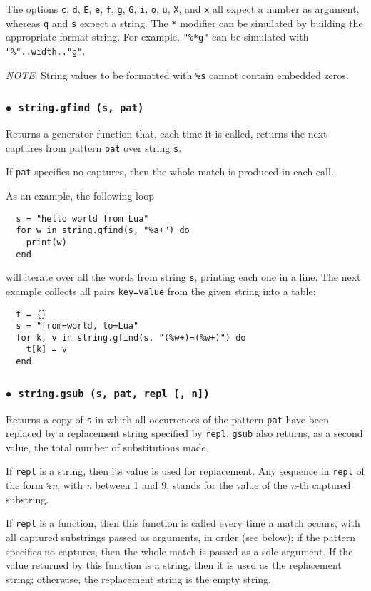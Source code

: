 \documentclass[11pt,twoside]{article}
\makeatletter
\newcommand{\M}[1]{{\rm\emph{#1}}}
\newcommand{\T}[1]{{\tt #1}}
\newcommand{\DefLIB}[1]{\index{#1@{\tt #1}}}
\newcommand{\ff}{$\bullet$\ }
\newcommand{\NOTE}{\par\medskip\noindent\emph{NOTE}: }
\makeatother
\begin{document}
The options \verb|c|, \verb|d|, \verb|E|, \verb|e|, \verb|f|,
\verb|g|, \verb|G|, \verb|i|, \verb|o|, \verb|u|, \verb|X|, and \verb|x| all
expect a number as argument,
whereas \verb|q| and \verb|s| expect a string.
The \verb|*| modifier can be simulated by building
the appropriate format string.
For example, \verb|"%*g"| can be simulated with
\verb|"%"..width.."g"|.

\NOTE
String values to be formatted with
\verb|%s| cannot contain embedded zeros.

\subsubsection*{\ff \T{string.gfind (s, pat)}}

Returns a generator function that,
each time it is called,
returns the next captures from pattern \verb|pat| over string \verb|s|.

If \verb|pat| specifies no captures,
then the whole match is produced in each call.

As an example, the following loop
\begin{verbatim}
  s = "hello world from Lua"
  for w in string.gfind(s, "%a+") do
    print(w)
  end
\end{verbatim}
will iterate over all the words from string \verb|s|,
printing each one in a line.
The next example collects all pairs \verb|key=value| from the
given string into a table:
\begin{verbatim}
  t = {}
  s = "from=world, to=Lua"
  for k, v in string.gfind(s, "(%w+)=(%w+)") do
    t[k] = v
  end
\end{verbatim}

\subsubsection*{\ff \T{string.gsub (s, pat, repl [, n])}}
\DefLIB{string.gsub}
Returns a copy of \verb|s|
in which all occurrences of the pattern \verb|pat| have been
replaced by a replacement string specified by \verb|repl|.
\verb|gsub| also returns, as a second value,
the total number of substitutions made.

If \verb|repl| is a string, then its value is used for replacement.
Any sequence in \verb|repl| of the form \verb|%|\M{n},
with \M{n} between 1 and 9,
stands for the value of the \M{n}-th captured substring.

If \verb|repl| is a function, then this function is called every time a
match occurs, with all captured substrings passed as arguments,
in order (see below);
if the pattern specifies no captures,
then the whole match is passed as a sole argument.
If the value returned by this function is a string,
then it is used as the replacement string;
otherwise, the replacement string is the empty string.
\end{document}
